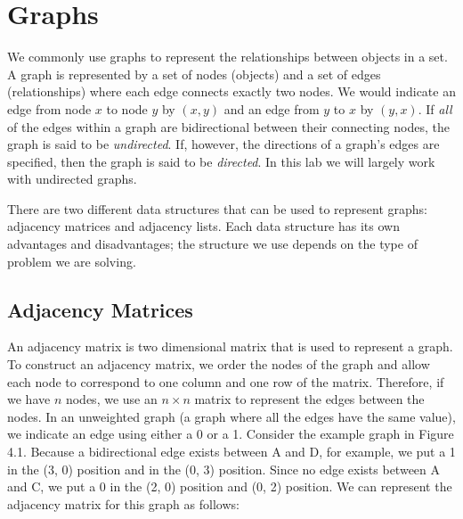 \label{lab:SixDegreesKevinBacon}


\section*{Graphs}
\label{Graphs_section}
We commonly use graphs to represent the relationships between objects in a set. A graph is
represented by a set of nodes (objects) and a set of edges (relationships) where each edge
connects exactly two nodes. We would indicate an edge from node $x$ to node $y$ by $(x, y)$
and an edge from $y$ to $x$ by $(y, x)$. If \emph{all} of the edges within a graph are bidirectional
between their connecting nodes, the graph is said to be \emph{undirected}. If, however, the directions
of a graph's edges are specified, then the graph is said to be \emph{directed}. In this lab we will largely work
with undirected graphs.

There are two different data structures that can be used to represent graphs: adjacency matrices and adjacency lists.
Each data structure has its own advantages and disadvantages; the structure we use depends on the type of problem we are solving.

\subsection*{Adjacency Matrices}
An adjacency matrix is two dimensional matrix that is used to represent a graph. To construct an adjacency matrix, we order
the nodes of the graph and allow each node to correspond to one column and one
row of the matrix. Therefore, if we have $n$ nodes, we use an $n \times n$ matrix to
represent the edges between the nodes. In an unweighted graph (a graph where all the edges have the same value), we indicate an
edge using either a 0 or a 1.
Consider the example graph in Figure 4.1. Because a bidirectional edge exists between A and D, for example, we put a 1 in the (3, 0) position and
in the (0, 3) position. Since no edge exists between A and C, we put a 0 in
the (2, 0) position and (0, 2) position. We can represent the adjacency matrix for this graph as follows:

